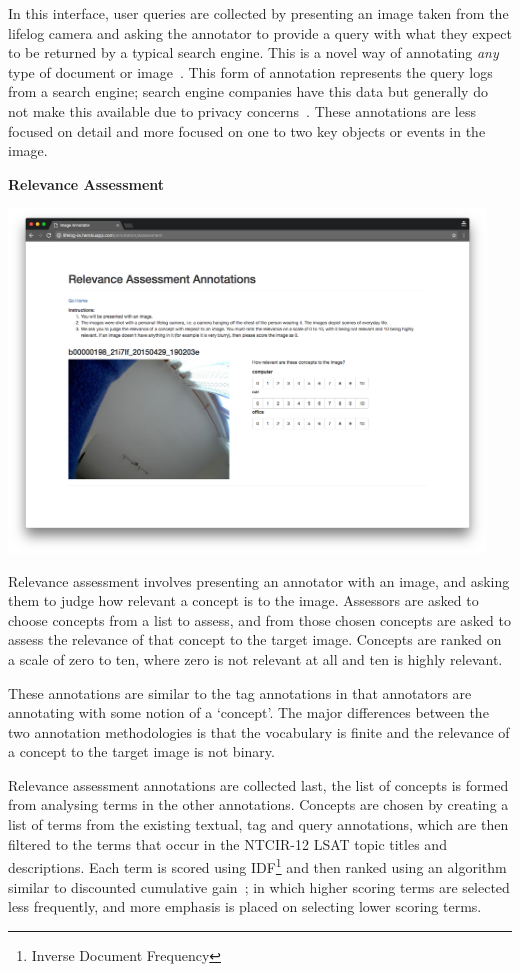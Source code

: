 In this interface, user queries are collected by presenting an image taken from the lifelog camera and asking the annotator to provide a query with what they expect to be returned by a typical search engine. This is a novel way of annotating \textit{any} type of document or image~\cite{quteprints82599}. This form of annotation represents the query logs from a search engine; search engine companies have this data but generally do not make this available due to privacy concerns~\cite{silvestri2010mining}. These annotations are less focused on detail and more focused on one to two key objects or events in the image.

\newpage
\textbf{Relevance Assessment}

\includegraphics[width=0.95\textwidth]{images/rel-ass-interface}

Relevance assessment involves presenting an annotator with an image, and asking them to judge how relevant a concept is to the image. Assessors are asked to choose concepts from a list to assess, and from those chosen concepts are asked to assess the relevance of that concept to the target image. Concepts are ranked on a scale of zero to ten, where zero is not relevant at all and ten is highly relevant.

These annotations are similar to the tag annotations in that annotators are annotating with some notion of a `concept'. The major differences between the two annotation methodologies is that the vocabulary is finite and the relevance of a concept to the target image is not binary.

Relevance assessment annotations are collected last, the list of concepts is formed from analysing terms in the other annotations. Concepts are chosen by creating a list of terms from the existing textual, tag and query annotations, which are then filtered to the terms that occur in the NTCIR-12 LSAT topic titles and descriptions. Each term is scored using IDF\footnote{Inverse Document Frequency} and then ranked using an algorithm similar to discounted cumulative gain~\cite{jarvelin2002cumulated}; in which higher scoring terms are selected less frequently, and more emphasis is placed on selecting lower scoring terms. 

